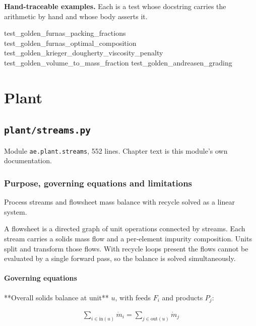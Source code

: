 \documentclass[10pt,a4paper,twoside]{report}
\newcommand{\theblurb}{}
\newcommand{\partblurb}[2]{%
  \renewcommand{\theblurb}{#2}%
  \part{#1}%
  \renewcommand{\theblurb}{}}
\begin{document}
\normalsize

\textbf{Hand-traceable examples.} Each is a test whose docstring carries the arithmetic by hand and whose body asserts it.

\begin{verbatimsmall}
test_golden_furnas_packing_fractions
test_golden_furnas_optimal_composition
test_golden_krieger_dougherty_viscosity_penalty
test_golden_volume_to_mass_fraction
test_golden_andreasen_grading
\end{verbatimsmall}

\clearpage

\partblurb{Plant}{Composition of unit operations into a flowsheet: stream balances, capacity, scheduling and the yield cascade.}

\chapter{\texttt{plant/streams.py}}\label{ch:streams}


{\footnotesize\color{slate}Module \texttt{ae.plant.streams}, 552 lines. Chapter text is this module's own documentation.\par}

\section{Purpose, governing equations and limitations}

Process streams and flowsheet mass balance with recycle solved as a linear system.

A flowsheet is a directed graph of unit operations connected by streams. Each stream carries a solids mass flow and a per-element impurity composition. Units split and transform those flows. With recycle loops present the flows cannot be evaluated by a single forward pass, so the balance is solved simultaneously.

\subsection*{Governing equations}

**Overall solids balance at unit** $u$, with feeds $F_{i}$ and products $P_{j}$:

\begin{equation*}
\begin{gathered}
\sum_{i \in \mathrm{in}(u)} \dot m_i = \sum_{j \in \mathrm{out}(u)} \dot m_j
\end{gathered}
\end{equation*}
\end{document}
